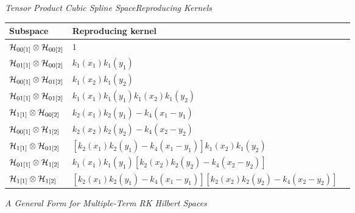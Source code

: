 \begin{frame}[c]{\emph{Tensor Product Cubic Spline Space}}{\textit{Reproducing Kernels}}

\scriptsize
\begin{tabular}{lll} %
\hline 
\hline %
Subspace 	& 		Reproducing kernel 		 \\
\hline %
$\mathcal{H}_{00\left[1\right]} \otimes \mathcal{H}_{00\left[2\right]}$ & 	$1$	\\ [1ex] 
$\mathcal{H}_{01\left[1\right]} \otimes \mathcal{H}_{00\left[2\right]} $& 	$k_1\left(x_1\right)k_1\left(y_1\right)$	\\ [1ex] 
$\mathcal{H}_{00\left[1\right]} \otimes \mathcal{H}_{01\left[2\right]} $& 	$k_1\left(x_2\right)k_1\left(y_2\right)$	\\ [1ex] 
$\mathcal{H}_{01\left[1\right]} \otimes \mathcal{H}_{01\left[2\right]}$ & 	$k_1\left(x_1\right)k_1\left(y_1\right)k_1\left(x_2\right)k_1\left(y_2\right)$ \\ [1ex] 
$\mathcal{H}_{1\left[1\right]} \otimes \mathcal{H}_{00\left[2\right]}$  	& 	$k_2\left(x_1\right)k_2\left(y_1\right) - k_4\left(x_1 - y_1\right)$	\\ [1ex] 
$\mathcal{H}_{00\left[1\right]} \otimes \mathcal{H}_{1\left[2\right]}$  	& 	$k_2\left(x_2\right)k_2\left(y_2\right) - k_4\left(x_2 - y_2\right)$	\\ [1ex] 
$\mathcal{H}_{1\left[1\right]} \otimes \mathcal{H}_{01\left[2\right]}$ 	& 	$\left[k_2\left(x_1\right)k_2\left(y_1\right) - k_4\left(x_1 - y_1\right)\right]k_1\left(x_2\right)k_1\left(y_2\right)$ \\ [1ex]  
$ \mathcal{H}_{01\left[1\right]}\otimes  \mathcal{H}_{1\left[2\right]}$ 	& 	$k_1\left(x_1\right)k_1\left(y_1\right)\left[k_2\left(x_2\right)k_2\left(y_2\right) - k_4\left(x_2 - y_2\right)\right]$ \\ [1ex]  
$\mathcal{H}_{1\left[1\right]} \otimes \mathcal{H}_{1\left[2\right]}$  & $\left[k_2\left(x_1\right)k_2\left(y_1\right) - k_4\left(x_1 - y_1\right)\right]\left[k_2\left(x_2\right)k_2\left(y_2\right) - k_4\left(x_2 - y_2\right)\right]$	\\ [1ex]  
\hline %
\hline %
\end{tabular}
\end{frame}


\begin{frame}{\textit{A General Form for Multiple-Term RK Hilbert Spaces}}{}

\end{frame}


